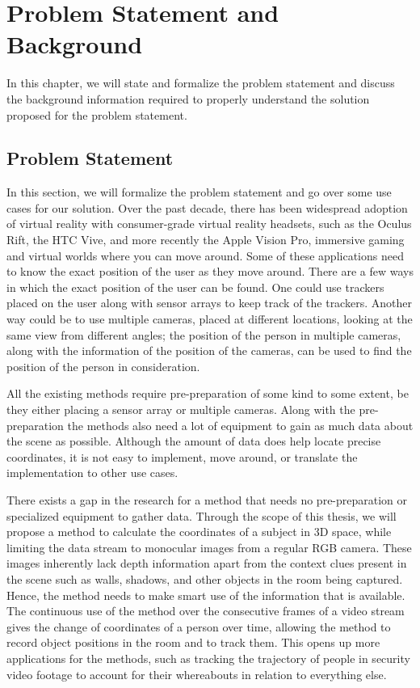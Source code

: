 \documentclass[12pt]{report}
\begin{document}
\chapter{Problem Statement and Background}

In this chapter, we will state and formalize the problem statement and discuss the background information required to properly understand the solution proposed for the problem statement.

\section{Problem Statement}

In this section, we will formalize the problem statement and go over some use cases for our solution. Over the past decade, there has been widespread adoption of virtual reality with consumer-grade virtual reality headsets, such as the Oculus Rift, the HTC Vive, and more recently the Apple Vision Pro, immersive gaming and virtual worlds where you can move around. Some of these applications need to know the exact position of the user as they move around. There are a few ways in which the exact position of the user can be found. One could use trackers placed on the user along with sensor arrays to keep track of the trackers. Another way could be to use multiple cameras, placed at different locations, looking at the same view from different angles; the position of the person in multiple cameras, along with the information of the position of the cameras, can be used to find the position of the person in consideration.\newline

All the existing methods require pre-preparation of some kind to some extent, be they either placing a sensor array or multiple cameras. Along with the pre-preparation the methods also need a lot of equipment to gain as much data about the scene as possible. Although the amount of data does help locate precise coordinates, it is not easy to implement, move around, or translate the implementation to other use cases.\newline

There exists a gap in the research for a method that needs no pre-preparation or specialized equipment to gather data. Through the scope of this thesis, we will propose a method to calculate the coordinates of a subject in 3D space, while limiting the data stream to monocular images from a regular RGB camera. These images inherently lack depth information apart from the context clues present in the scene such as walls, shadows, and other objects in the room being captured. Hence, the method needs to make smart use of the information that is available. The continuous use of the method over the consecutive frames of a video stream gives the change of coordinates of a person over time, allowing the method to record object positions in the room and to track them. This opens up more applications for the methods, such as tracking the trajectory of people in security video footage to account for their whereabouts in relation to everything else.
\end{document}
